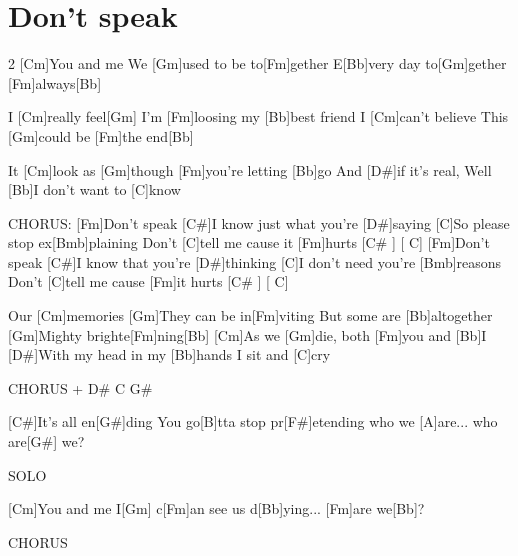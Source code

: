 \section{Don't speak}
\begin{guitar}
\begin{multicols}{2}
[Cm]You and me
We [Gm]used to be to[Fm]gether
E[Bb]very day to[Gm]gether [Fm]always[Bb]{}


I [Cm]really feel[Gm]
I'm [Fm]loosing my [Bb]best friend
I [Cm]can't believe
This [Gm]could be [Fm]the end[Bb]

It [Cm]look as [Gm]though [Fm]you're letting [Bb]go
And [D#]if it's real,
Well [Bb]I don't want to [C]know


CHORUS:
[Fm]Don't speak
[C#]I know just what you're [D#]saying
[C]So please stop ex[Bmb]plaining
Don't [C]tell me cause it [Fm]hurts     [C# ]     [ C]{}
[Fm]Don't speak
[C#]I know that you're [D#]thinking
[C]I don't need you're [Bmb]reasons
Don't [C]tell me cause [Fm]it hurts     [C# ]     [ C]{}


Our [Cm]memories
[Gm]They can be in[Fm]viting
But some are [Bb]altogether
[Gm]Mighty brighte[Fm]ning[Bb]{}
[Cm]As we [Gm]die, both [Fm]you and [Bb]I
[D#]With my head in my [Bb]hands
I sit and [C]cry


CHORUS + D\# C G\#


[C#]It's all en[G#]ding
You go[B]tta stop pr[F#]etending who we [A]are...
who are[G#] we?


SOLO


[Cm]You and me
I[Gm] c[Fm]an see us d[Bb]ying... [Fm]are we[Bb]?


CHORUS
\end{multicols}
\end{guitar}

